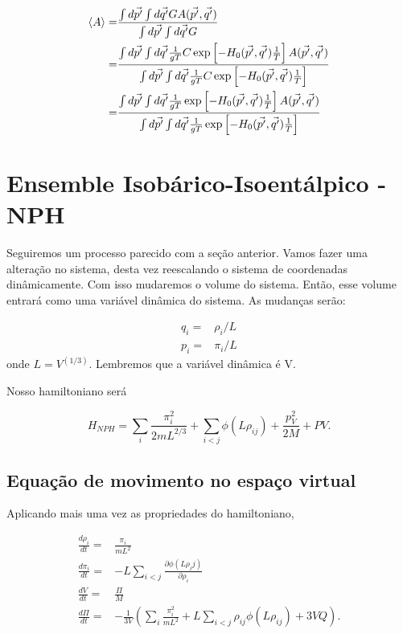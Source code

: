 \documentclass[twoside, a4paper]{scrartcl}
\newcommand{\del}[2]{\frac{\partial #1}{\partial #2}}
\newcommand{\deri}[2]{\frac{d #1}{d #2}}
\begin{document}
\begin{align}
	\left<A\right> =& \frac{ \int d\vec{p'} \int d\vec{q'} G A(\vec{p'}, \vec{q'})} {\int d\vec{p'} \int d\vec{q'}G} \notag \\
	=& \frac{ \int d\vec{p'} \int d\vec{q'} \frac{1}{gT} C \exp\left[-H_0(\vec{p'}, \vec{q'}) \frac{1}{T}\right] A(\vec{p'}, \vec{q'})}
	{ \int d\vec{p'} \int d\vec{q'} \frac{1}{gT} C \exp\left[-H_0(\vec{p'}, \vec{q'}) \frac{1}{T}\right]} \notag \\
	=& \frac{ \int d\vec{p'} \int d\vec{q'} \frac{1}{gT} \exp\left[-H_0(\vec{p'}, \vec{q'}) \frac{1}{T}\right] A(\vec{p'}, \vec{q'})}
	{ \int d\vec{p'} \int d\vec{q'} \frac{1}{gT} \exp\left[-H_0(\vec{p'}, \vec{q'}) \frac{1}{T}\right]} 
\end{align}

\section{Ensemble Isobárico-Isoentálpico - NPH}

Seguiremos um processo parecido com a seção anterior. Vamos fazer uma alteração no sistema, desta vez reescalando o sistema de coordenadas dinâmicamente. Com isso mudaremos o volume do sistema. Então, esse volume entrará como uma variável dinâmica do sistema. As mudanças serão:

\begin{align}
	q_i =& \rho_i/L \\
	p_i =& \pi_i/L
\end{align}
onde $L = V^(1/3)$. Lembremos que a variável dinâmica é V.

Nosso hamiltoniano será 

\begin{equation}
	H_{NPH} = \sum_i \frac{\pi_i^2}{2mL^{2/3}} + \sum_{i<j} \phi(L \rho_{ij}) + \frac{p_V^2}{2M} + PV.
\end{equation}

\subsection{Equação de movimento no espaço virtual}

Aplicando mais uma vez as propriedades do hamiltoniano,

\begin{align}
	\deri{\rho_i}{t} =& \frac{\pi_i}{mL^2} \\
	\deri{\pi_i}{t} =& -L \sum_{i<j} \del{\phi(L \rho_ij)}{\rho_i}\\
	\deri{V}{t} =& \frac{\Pi}{M} \\
	\deri{\Pi}{t} =& - \frac{1}{3V} \left( \sum_i \frac{\pi_i^2}{mL^2} + L\sum_{i<j} \rho_{ij} \phi(L\rho_{ij}) + 3VQ\right).
\end{align}
\end{document}
